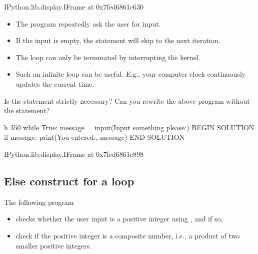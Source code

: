 \documentclass[letterpaper,10pt,english]{sphinxmanual}
\begin{document}
\begin{sphinxVerbatim}[commandchars=\\\{\}]
\PYGZlt{}IPython.lib.display.IFrame at 0x7fed6861c630\PYGZgt{}
\end{sphinxVerbatim}
\begin{itemize}
\item {} 
The program repeatedly ask the user for input.

\item {} 
If the input is empty, the  statement will skip to the next iteration.

\item {} 
The loop can only be terminated by interrupting the kernel.

\item {} 
Such an infinite loop can be useful. E.g., your computer clock continuously updates the current time.

\end{itemize}

 Is the  statement strictly necessary? Can you rewrite the above program without the  statement?

\begin{sphinxVerbatim}[commandchars=\\\{\}]
 \PYGZhy{}h 350
while True:
    message = input(\PYGZsq{}Input something please:\PYGZsq{})
    \PYGZsh{}\PYGZsh{}\PYGZsh{} BEGIN SOLUTION
    if message:
        print(\PYGZsq{}You entered:\PYGZsq{}, message)
    \PYGZsh{}\PYGZsh{}\PYGZsh{} END SOLUTION
\end{sphinxVerbatim}

\begin{sphinxVerbatim}[commandchars=\\\{\}]
\PYGZlt{}IPython.lib.display.IFrame at 0x7fed6861c898\PYGZgt{}
\end{sphinxVerbatim}


\subsection{Else construct for a loop}
\label{\detokenize{Lecture3/Iteration:else-construct-for-a-loop}}
The following program
\begin{itemize}
\item {} 
checks whether the user input is a positive integer using , and if so,

\item {} 
check if the positive integer is a composite number, i.e., a product of two smaller positive integers.

\end{itemize}
\end{document}

